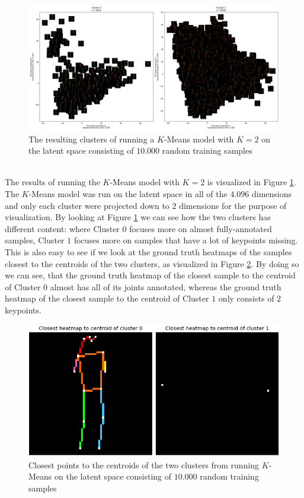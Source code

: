 \documentclass[./main.tex]{subfiles}
\begin{document}
\begin{figure}[htbp]
    \centering
    \includegraphics[width = \textwidth]{entities/cluster_all_skeletons.png}
    \caption{The resulting clusters of running a $K$-Means model with $K = 2$ on the latent space consisting of $10.000$ random training samples}
    \label{fig:clusters_all_skeletons}
\end{figure}
\\
The results of running the $K$-Means model with $K = 2$ is visualized in Figure \ref{fig:clusters_all_skeletons}. The $K$-Means model was run on the latent space in all of the $4.096$ dimensions and only each cluster were projected down to $2$ dimensions for the purpose of visualization. By looking at Figure \ref{fig:clusters_all_skeletons} we can see how the two clusters has different content: where Cluster $0$ focuses more on almost fully-annotated samples, Cluster $1$ focuses more on samples that have a lot of keypoints missing. This is also easy to see if we look at the ground truth heatmaps of the samples closest to the centroids of the two clusters, as visualized in Figure \ref{fig:centroids_all}. By doing so we can see, that the ground truth heatmap of the closest sample to the centroid of Cluster $0$ almost has all of its joints annotated, whereas the ground truth heatmap of the closest sample to the centroid of Cluster $1$ only consists of $2$ keypoints.
\\
\begin{figure}[htbp]
    \centering
    \includegraphics[height = 4 cm]{entities/centroids_all_skeletons.png}
    \caption{Closest points to the centroids of the two clusters from running $K$-Means on the latent space consisting of $10.000$ random training samples}
    \label{fig:centroids_all}
\end{figure}
\end{document}
